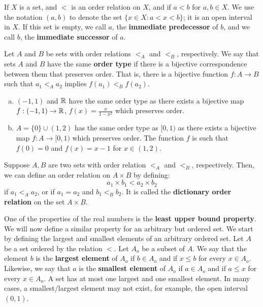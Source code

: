 \documentclass[a4paper,english,12pt]{article}
\begin{document}
\begin{defn}
If $X$ is a set, and $<$ is an order relation on $X$, and if $a < b$ for $a, b \in X$. We use the notation $(a,b)$ to denote the set $ \{ x \in X: a < x < b \}$; it is an open interval in $X$. If this set is empty, we call $a$, the \textbf{immediate predecessor} of $b$, and we call $b$, the \textbf{immediate successor} of $a$.
\end{defn}


\begin{defn}
Let $A$ and $B$ be sets with order relations $<_{A}$ and $<_{B}$, respectively. We say that sets $A$ and $B$ have the same \textbf{order type} if there is a bijective correspondence between them that preserves order. That is, there is a bijective function $f: A \to B$ such that $a_{1} <_{A} a_{2}$ implies $f(a_{1}) <_{B} f(a_{2})$.
\end{defn}

\begin{exmp}
\begin{enumerate}[a)]
\item $(-1, 1)$ and $\mathbb{R}$ have the same order type as there exists a bijective map $f:(-1, 1) \to \mathbb{R}$, $f(x) = \frac{x}{1 - x^{2}}$ which preserves order.
\item $A = \{0\} \cup (1, 2)$ has the same order type as $[0, 1)$ as there exists a bijective map $f: A \to [0, 1)$ which preserves order. The function $f$ is such that $f(0) = 0$ and $f(x) = x-1$ for $x \in (1, 2)$.

\end{enumerate}
\end{exmp}


\begin{defn} 
Suppose $A, B$ are two sets with order relation $<_{A}$ and $<_{B}$, respectively. Then, we can define an order relation on $A \times B$ by defining: 
\begin{equation}
a_{1} \times b_{1} < a_{2} \times b_{2} \nonumber
\end{equation}
if $a_{1} <_{A} a_{2}$, or if $a_{1} = a_{2}$ and $b_{1} <_{B} b_{2}$. It is called the \textbf{dictionary order relation} on the set $A \times B$. 
\end{defn}

One of the properties of the real numbers is the \textbf{least upper bound property}. We will now define a similar property for an arbitrary but ordered set. We start by defining the largest and smallest elements of an arbitrary ordered set. Let $A$ be a set ordered by the relation $<$. Let $A_{o}$ be a subset of $A$.  We say that the element $b$ is the \textbf{largest element} of $A_{o}$ if $b \in A_{o}$ and if $x \le b$ for every $x \in A_{o}$. Likewise, we say that $a$ is the \textbf{smallest element} of $A_{o}$ if $a \in A_{o}$ and if $a \le x$ for every $x \in A_{o}$. A set has at most one largest and one smallest element. In many cases, a smallest/largest element may not exist, for example, the open interval $(0,1)$. 
\end{document}
